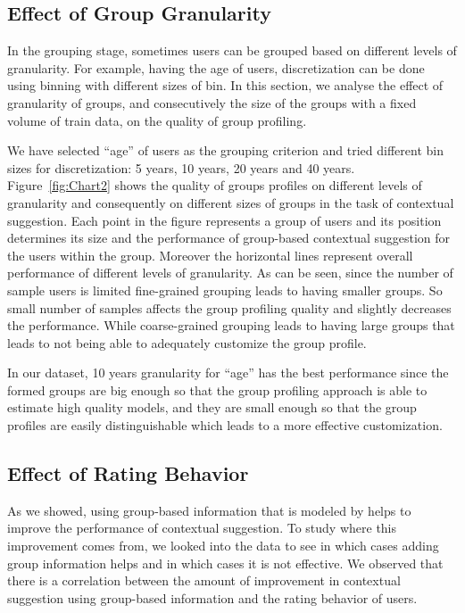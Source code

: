 \subsection{Effect of Group Granularity}
\label{sec:gg}
In the grouping stage, sometimes users can be grouped based on different levels of granularity. For example, having the age of users, discretization can be done using binning with different sizes of bin. In this section, we analyse the effect of granularity of groups, and consecutively the size of the groups with a fixed volume of train data, on the quality of group profiling.

We have selected ``age'' of users as the grouping criterion and tried different bin sizes for discretization: 5 years, 10 years, 20 years and 40 years. 
Figure~\ref{fig:Chart2} shows the quality of groups profiles on different levels of granularity and consequently on different sizes of groups in the task of contextual suggestion. 
Each point in the figure represents a group of users and its position determines its size and the performance of group-based contextual suggestion for the users within the group. Moreover the horizontal lines represent overall performance of different levels of granularity. 
As can be seen, since the number of sample users is limited fine-grained grouping leads to having smaller groups. So small number of samples affects the group profiling quality and slightly decreases the performance. While coarse-grained grouping leads to having large groups that leads to not being able to adequately customize the group profile. 

In our dataset, 10 years granularity for ``age'' has the best performance since the formed groups are big enough so that the group profiling approach is able to estimate high quality models, and they are small enough so that the group profiles are easily distinguishable which leads to a more effective customization.


\subsection{Effect of Rating Behavior}
\label{sec:rb}
As we showed, using group-based information that is modeled by \acswlm helps to improve the performance of contextual suggestion. To study where this improvement comes from, we looked into the data to see in which cases adding group information helps and in which cases it is not effective. We observed that there is a correlation between the amount of improvement in contextual suggestion using group-based information and the rating behavior of users.


